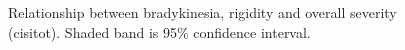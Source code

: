 \documentclass[10pt]{article}
\begin{document}
\begin{figure}[h]
  \centering

  \caption{Relationship between \protect{} bradykinesia,
  \protect{} rigidity and overall severity (cisitot). Shaded band
is 95\% confidence interval.}
  \label{fig:corrxy-br}
\end{figure}
\end{document}
